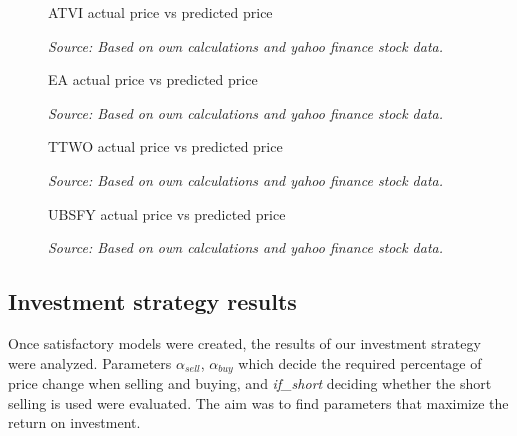 \documentclass[review]{elsarticle} %
\begin{document}
\begin{figure}[H]
\caption{ATVI actual price vs predicted price}
\begin{adjustbox}{width=1.3\textwidth,center}

\end{adjustbox}
\caption*{\textit{Source: Based on own calculations and yahoo finance stock data.}}
\end{figure}

\begin{figure}[H]
\caption{EA actual price vs predicted price}
\begin{adjustbox}{width=1.3\textwidth,center}

\end{adjustbox}
\caption*{\textit{Source: Based on own calculations and yahoo finance stock data.}}
\end{figure}

\begin{figure}[H]
\caption{TTWO actual price vs predicted price}
\begin{adjustbox}{width=1.3\textwidth,center}

\end{adjustbox}
\caption*{\textit{Source: Based on own calculations and yahoo finance stock data.}}
\end{figure}

\begin{figure}[H]
\caption{UBSFY actual price vs predicted price}
\begin{adjustbox}{width=1.3\textwidth,center}

\end{adjustbox}
\caption*{\textit{Source: Based on own calculations and yahoo finance stock data.}}
\end{figure}

\subsection{Investment strategy results}
Once satisfactory models were created, the results of our investment strategy were analyzed. Parameters  $\alpha_{sell}$, $\alpha_{buy}$  which decide the required percentage of price change when selling and buying, and \textit{if\_short} deciding whether the short selling is used were evaluated. The aim was to find parameters that maximize the return on investment.
\end{document}
